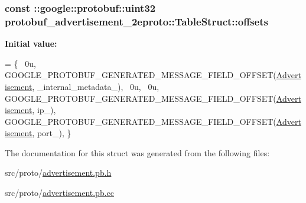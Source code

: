 \subsubsection[{\texorpdfstring{offsets}{offsets}}]{\setlength{\rightskip}{0pt plus 5cm}const \+::google\+::protobuf\+::uint32 protobuf\+\_\+advertisement\+\_\+2eproto\+::\+Table\+Struct\+::offsets\hspace{0.3cm}{\ttfamily [static]}}\hypertarget{structprotobuf__advertisement__2eproto_1_1_table_struct_a4126f35a0f4e23e0f9ffee93f1f3a67f}{}\label{structprotobuf__advertisement__2eproto_1_1_table_struct_a4126f35a0f4e23e0f9ffee93f1f3a67f}
{\bfseries Initial value\+:}
\begin{DoxyCode}
= \{
  ~0u,  
  GOOGLE\_PROTOBUF\_GENERATED\_MESSAGE\_FIELD\_OFFSET(\hyperlink{class_advertisement}{Advertisement}, \_internal\_metadata\_),
  ~0u,  
  ~0u,  
  GOOGLE\_PROTOBUF\_GENERATED\_MESSAGE\_FIELD\_OFFSET(\hyperlink{class_advertisement}{Advertisement}, ip\_),
  GOOGLE\_PROTOBUF\_GENERATED\_MESSAGE\_FIELD\_OFFSET(\hyperlink{class_advertisement}{Advertisement}, port\_),
\}
\end{DoxyCode}


The documentation for this struct was generated from the following files\+:\begin{DoxyCompactItemize}
\item 
src/proto/\hyperlink{advertisement_8pb_8h}{advertisement.\+pb.\+h}\item 
src/proto/\hyperlink{advertisement_8pb_8cc}{advertisement.\+pb.\+cc}\end{DoxyCompactItemize}
